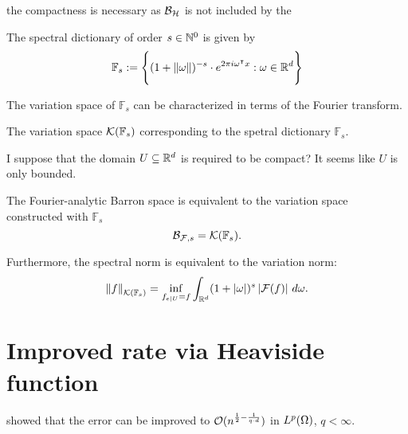 \begin{remark}
    the compactness is necessary as $\mathcal{B}_{\mathcal{H}}$ is not included by the
\end{remark}

\begin{definition}
    The spectral dictionary of order $s \in \mathbb{N}^0$ is given by
    \begin{equation}
        \mathbb{F}_s := \Bigg\{ 
            (1 + \left\| \omega \right\|)^{-s} \cdot e^{2\pi i\omega{}^{\intercal} x}: 
            \omega \in \mathbb{R}^d
        \Bigg\}
    \end{equation}
\end{definition}

The variation space of $\mathbb{F}_s$ can be characterized in terms of the
Fourier transform.

The variation space $\mathcal{K}({\mathbb{F}_s})$ corresponding to the spetral
dictionary $\mathbb{F}_s$.

I suppose that the domain $U \subseteq \mathbb{R}^d$ is required to be compact?
It seems like $U$ is only bounded.

\begin{theorem}
The Fourier-analytic Barron space is equivalent to the variation space
constructed with $\mathbb{F}_s$
\begin{equation}
    \mathcal{B}_{\mathcal{F}, s} = \mathcal{K}({\mathbb{F}_s}).
\end{equation}

Furthermore, the spectral norm is equivalent to the variation norm:
\begin{equation}
    \left\| {f} \right\|_{\mathcal{K}({\mathbb{F}_s})} =
    \inf_{f_{e\mid U} = f} \int_{\mathbb{R}^d} 
    (1+\left| \omega \right|)^s \left| \mathcal{F}(f) \right| \,d\omega.
\end{equation}
\end{theorem}



\section{Improved rate via Heaviside function}
\label{sec:improved_heaviside}


\cite{makovozRandomApproximantsNeural1996} showed that the error can be improved
to $\mathcal{O}(n^{\frac{1}{2} - \frac{1}{q\cdot d}})$ in $L^{p}(\Omega)$, $q <
\infty$.


